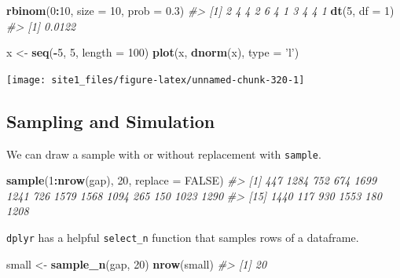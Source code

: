 \documentclass[]{book}
\newenvironment{Shaded}{\begin{snugshade}}{\end{snugshade}}
\newcommand{\CommentTok}[1]{\textcolor[rgb]{0.56,0.35,0.01}{\textit{#1}}}
\newcommand{\DataTypeTok}[1]{\textcolor[rgb]{0.13,0.29,0.53}{#1}}
\newcommand{\DecValTok}[1]{\textcolor[rgb]{0.00,0.00,0.81}{#1}}
\newcommand{\FloatTok}[1]{\textcolor[rgb]{0.00,0.00,0.81}{#1}}
\newcommand{\KeywordTok}[1]{\textcolor[rgb]{0.13,0.29,0.53}{\textbf{#1}}}
\newcommand{\NormalTok}[1]{#1}
\newcommand{\OperatorTok}[1]{\textcolor[rgb]{0.81,0.36,0.00}{\textbf{#1}}}
\newcommand{\OtherTok}[1]{\textcolor[rgb]{0.56,0.35,0.01}{#1}}
\newcommand{\StringTok}[1]{\textcolor[rgb]{0.31,0.60,0.02}{#1}}
\begin{document}
\begin{Shaded}
\begin{Highlighting}[]
\KeywordTok{rbinom}\NormalTok{(}\DecValTok{0}\OperatorTok{:}\DecValTok{10}\NormalTok{, }\DataTypeTok{size =} \DecValTok{10}\NormalTok{, }\DataTypeTok{prob =} \FloatTok{0.3}\NormalTok{)}
\CommentTok{#>  [1] 2 4 4 2 6 4 1 3 4 4 1}
\KeywordTok{dt}\NormalTok{(}\DecValTok{5}\NormalTok{, }\DataTypeTok{df =} \DecValTok{1}\NormalTok{)}
\CommentTok{#> [1] 0.0122}

\NormalTok{x <-}\StringTok{ }\KeywordTok{seq}\NormalTok{(}\OperatorTok{-}\DecValTok{5}\NormalTok{, }\DecValTok{5}\NormalTok{, }\DataTypeTok{length =} \DecValTok{100}\NormalTok{)}
\KeywordTok{plot}\NormalTok{(x, }\KeywordTok{dnorm}\NormalTok{(x), }\DataTypeTok{type =} \StringTok{'l'}\NormalTok{)}
\end{Highlighting}
\end{Shaded}

\begin{center}\texttt{[image: site1\_files/figure-latex/unnamed-chunk-320-1]} \end{center}

\hypertarget{sampling-and-simulation}{%
\subsection{Sampling and Simulation}\label{sampling-and-simulation}}

We can draw a sample with or without replacement with \texttt{sample}.

\begin{Shaded}
\begin{Highlighting}[]
\KeywordTok{sample}\NormalTok{(}\DecValTok{1}\OperatorTok{:}\KeywordTok{nrow}\NormalTok{(gap), }\DecValTok{20}\NormalTok{, }\DataTypeTok{replace =} \OtherTok{FALSE}\NormalTok{)}
\CommentTok{#>  [1]  447 1284  752  674 1699 1241  726 1579 1568 1094  265  150 1023 1290}
\CommentTok{#> [15] 1440  117  930 1553  180 1208}
\end{Highlighting}
\end{Shaded}

\texttt{dplyr} has a helpful \texttt{select\_n} function that samples rows of a dataframe.

\begin{Shaded}
\begin{Highlighting}[]
\NormalTok{small <-}\StringTok{ }\KeywordTok{sample_n}\NormalTok{(gap, }\DecValTok{20}\NormalTok{)}
\KeywordTok{nrow}\NormalTok{(small)}
\CommentTok{#> [1] 20}
\end{Highlighting}
\end{Shaded}
\end{document}
